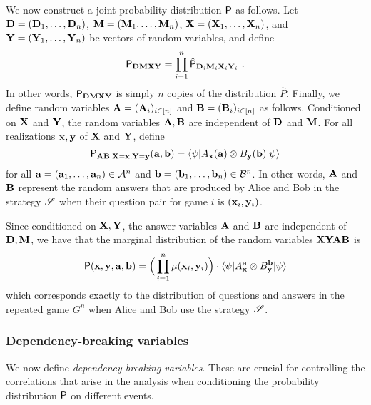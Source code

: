 We now construct a joint probability distribution $\P$ as follows. Let $\bD = (\bD_1,\ldots,\bD_n)$, $\bM = (\bM_1,\ldots,\bM_n)$, $\bX = (\bX_1,\ldots,\bX_n)$, and $\bY = (\bY_1,\ldots,\bY_n)$ be vectors of random variables, and define
\[
	\P_{\bD \bM \bX \bY} = \prod_{i=1}^n \hat{\P}_{\bD_i \bM_i \bX_i \bY_i}~.
\]
In other words, $\P_{\bD \bM \bX \bY}$ is simply $n$ copies of the distribution $\hat{P}$. Finally, we define random variables $\bA = (\bA_i)_{i \in [n]}$ and $\bB = (\bB_i)_{i \in [n]}$ as follows. Conditioned on $\bX$ and $\bY$, the random variables $\bA,\bB$ are independent of $\bD$ and $\bM$. For all realizations $\bx, \by$ of $\bX$ and $\bY$, define
\[
	\P_{\bA \bB | \bX = \bx, \bY = \by}(\ba,\bb) = \bra{\psi} A_\bx(\ba) \otimes B_\by(\bb) \ket{\psi}
\]
for all $\ba = (\ba_1,\ldots,\ba_n) \in \A^n$ and $\bb = (\bb_1,\ldots,\bb_n) \in \B^n$. In other words, $\bA$ and $\bB$ represent the random answers that are produced by Alice and Bob in the strategy $\strategy$ when their question pair for game $i$ is $(\bx_i,\by_i)$. 

Since conditioned on $\bX, \bY$, the answer variables $\bA$ and $\bB$ are independent of $\bD,\bM$, we have that the marginal distribution of the random variables $\bX \bY \bA \bB$ is
	\[
		\P(\bx,\by,\ba,\bb) = \Big ( \prod_{i=1}^n \mu(\bx_i,\by_i) \Big) \cdot \bra{\psi} A^{\ba}_\bx \otimes B^{\bb}_\by \ket{\psi}
	\]
	which corresponds exactly to the distribution of questions and answers in the repeated game $G^n$ when Alice and Bob use the strategy $\strategy$.

%
%
%	


\subsubsection{Dependency-breaking variables} 
We now define \emph{dependency-breaking variables}. These are crucial for controlling the correlations that arise in the analysis when conditioning the probability distribution $\P$ on different events. 

